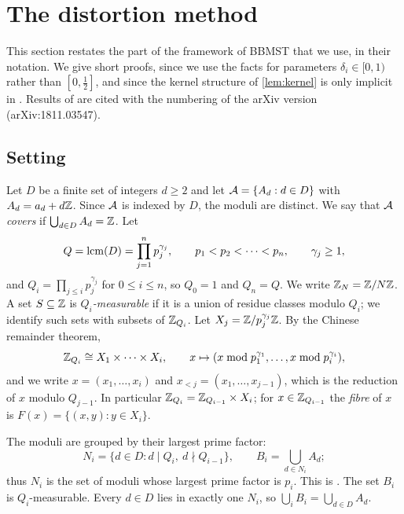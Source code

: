 \section{The distortion method}\label{sec:distortion}

This section restates the part of the framework of BBMST \cite{BBMST} that we use, in their notation. We give
short proofs, since we use the facts for parameters $\delta_i\in[0,1)$ rather than $[0,\frac12]$, and since the
kernel structure of \cref{lem:kernel} is only implicit in \cite{BBMST}. Results of \cite{BBMST} are cited with
the numbering of the arXiv version (arXiv:1811.03547).

\subsection{Setting}\label{sec:setting}

Let $D$ be a finite set of integers $d\ge2$ and let $\mathcal{A}=\{A_d:d\in D\}$ with $A_d=a_d+d\mathbb{Z}$. Since $\mathcal{A}$ is
indexed by $D$, the moduli are distinct. We say that $\mathcal{A}$ \emph{covers} if $\bigcup_{d\in D}A_d=\mathbb{Z}$. Let
\[
  Q=\operatorname{lcm}(D)=\prod_{j=1}^n p_j^{\gamma_j},\qquad p_1<p_2<\dots<p_n,\qquad \gamma_j\ge1,
\]
and $Q_i=\prod_{j\le i}p_j^{\gamma_j}$ for $0\le i\le n$, so $Q_0=1$ and $Q_n=Q$. We write $\mathbb{Z}_N=\mathbb{Z}/N\mathbb{Z}$. A set
$S\subseteq\mathbb{Z}$ is \emph{$Q_i$-measurable} if it is a union of residue classes modulo $Q_i$; we identify such sets
with subsets of $\mathbb{Z}_{Q_i}$. Let $X_j=\mathbb{Z}/p_j^{\gamma_j}\mathbb{Z}$. By the Chinese remainder theorem,
\[
  \mathbb{Z}_{Q_i}\cong X_1\times\dots\times X_i,\qquad x\mapsto(x\bmod p_1^{\gamma_1},\dots,x\bmod p_i^{\gamma_i}),
\]
and we write $x=(x_1,\dots,x_i)$ and $x_{<j}=(x_1,\dots,x_{j-1})$, which is the reduction of $x$ modulo $Q_{j-1}$.
In particular $\mathbb{Z}_{Q_i}=\mathbb{Z}_{Q_{i-1}}\times X_i$; for $x\in\mathbb{Z}_{Q_{i-1}}$ the \emph{fibre} of $x$ is
$F(x)=\{(x,y):y\in X_i\}$.

The moduli are grouped by their largest prime factor:
\begin{equation}\label{eq:levels}
  N_i=\{d\in D: d\mid Q_i,\ d\nmid Q_{i-1}\},\qquad B_i=\bigcup_{d\in N_i}A_d ;
\end{equation}
thus $N_i$ is the set of moduli whose largest prime factor is $p_i$. This is \cite[(3)]{BBMST}. The set $B_i$ is $Q_i$-measurable. Every $d\in D$ lies in exactly one $N_i$, so
$\bigcup_iB_i=\bigcup_{d\in D}A_d$.

